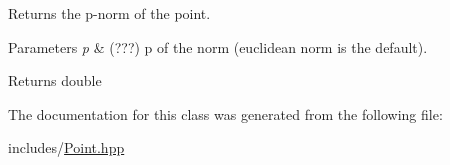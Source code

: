 Returns the p-\/norm of the point. 


\begin{DoxyParams}{Parameters}
{\em p} & (???) p of the norm (euclidean norm is the default). \\
\hline
\end{DoxyParams}
\begin{DoxyReturn}{Returns}
double 
\end{DoxyReturn}


The documentation for this class was generated from the following file\+:\begin{DoxyCompactItemize}
\item 
includes/\mbox{\hyperlink{_point_8hpp}{Point.\+hpp}}\end{DoxyCompactItemize}
